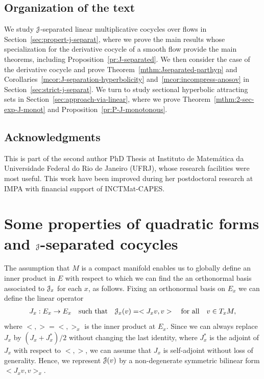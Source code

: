 \documentclass[12pt,reqno]{amsart}
\numberwithin{equation}{section}
\theoremstyle{plain}
\theoremstyle{definition}
\newcommand{\J}{\EuScript{J}}
\begin{document}
\subsection{Organization of the text}
\label{sec:organiz-text}

We study $\J$-separated linear multiplicative cocycles over
flows in Section~\ref{sec:propert-j-separat}, where we prove
the main results whose specialization for the derivative
cocycle of a smooth flow provide the main theorems,
including Proposition~\ref{pr:J-separated}. We then consider
the case of the derivative cocycle and prove
Theorem~\ref{mthm:Jseparated-parthyp} and
Corollaries~\ref{mcor:J-separation-hyperbolicity}
and~\ref{mcor:incompress-anosov} in
Section~\ref{sec:strict-j-separat}. We turn to study
sectional hyperbolic attracting sets in
Section~\ref{sec:approach-via-linear}, where we prove
Theorem~\ref{mthm:2-sec-exp-J-monot} and
Proposition~\ref{pr:P-J-monotonous}.

\subsection*{Acknowledgments}

This is part of the second author PhD Thesis
\cite{luciana-tese} at Instituto de Mate\-m\'atica da
Universidade Federal do Rio de Janeiro (UFRJ), whose
research facilities were most useful. This work have been 
improved during her postdoctoral research at IMPA with financial 
support of INCTMat-CAPES.


\section{Some properties of quadratic forms and
  $\J$-separated cocycles}
\label{sec:propert-quadrat-forms}

The assumption that $M$ is a compact manifold enables us to
globally define an inner product in $E$ with respect to
which we can find the an orthonormal basis associated to
$\J_x$ for each $x$, as follows. Fixing an orthonormal basis
on $E_x$ we can define the linear operator
\begin{align*}
  J_x:E_x\to E_x \quad\text{such that}\quad \J_x(v)=<J_x
  v,v> \quad \text{for all}\quad v\in T_xM,
\end{align*}
where $<,>=<,>_x$ is the inner product at $E_x$. Since we
can always replace $J_x$ by $(J_x+J_x^*)/2$ without changing
the last identity, where $J_x^*$ is the adjoint of $J_x$
with respect to $<,>$, we can assume that $J_x$ is
self-adjoint without loss of generality.  Hence, we
represent $\J(v)$ by a non-degenerate symmetric bilinear
form $<J_x v,v>_x$.
\end{document}
